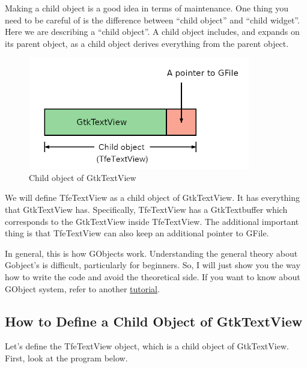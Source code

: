 Making a child object is a good idea in terms of maintenance. One thing
you need to be careful of is the difference between ``child object'' and
``child widget''. Here we are describing a ``child object''. A child
object includes, and expands on its parent object, as a child object
derives everything from the parent object.

\begin{figure}
\centering
\includegraphics[width=9.675cm,height=4.89cm]{../image/child.png}
\caption{Child object of GtkTextView}
\end{figure}

We will define TfeTextView as a child object of GtkTextView. It has
everything that GtkTextView has. Specifically, TfeTextView has a
GtkTextbuffer which corresponds to the GtkTextView inside TfeTextView.
The additional important thing is that TfeTextView can also keep an
additional pointer to GFile.

In general, this is how GObjects work. Understanding the general theory
about Gobject's is difficult, particularly for beginners. So, I will
just show you the way how to write the code and avoid the theoretical
side. If you want to know about GObject system, refer to another
\href{https://github.com/ToshioCP/Gobject-tutorial}{tutorial}.

\hypertarget{how-to-define-a-child-object-of-gtktextview}{%
\subsection{How to Define a Child Object of
GtkTextView}\label{how-to-define-a-child-object-of-gtktextview}}

Let's define the TfeTextView object, which is a child object of
GtkTextView. First, look at the program below.

